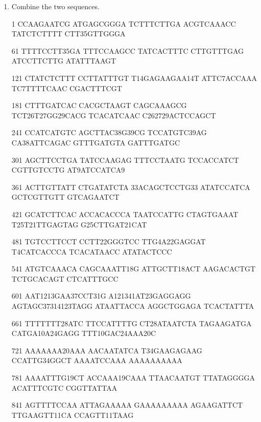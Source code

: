 \begin{enumerate}
{1501   ATTAGTCAAA ACGGACCAAG AAGATGAT}


Arabidopsis BAN promoter:

{\tiny
1      TTGGTA9GATG AT16AAC917AAATC AGAACTCTG13A AGG1617TCAA1324TCT TTTTT24GATTC TTA18GG12TG14AAG

61     ACAAG121418TTGGT T1ATTTCAAA1G ATCACGTG2CT TACCTT2CTAA AACAG3CCTTA TTGA3TCTACT

121    GTTGTACCTA 20A21TG22A19GCAAGG20 A22CTATTTG45C1921A A15ATCTT4TT5TA CTTCTT15A7TAT A23GAAG7TCTCA

181    AGA23CGATAAA CTCATAAC8AA CTAAAT81011C6TCT ATCTCT611G10TAA TTTCAAAAGT ACAATC}

\item Combine the two sequences.

{\tiny

1      CCAAGAATCG ATGAGCGGGA TCTTTCTTGA ACGTCAAACC TATCTCTTTT CTT35GTTGGGA

61     TTTTCCTT35GA TTTCCAAGCC TATCACTTTC CTTGTTTGAG ATCCTTCTTG ATATTTAAGT

121    CTATCTCTTT CCTTATTTGT T14GAGAAGAA14T ATTC7ACCAAA TC7TTTTCAAC CGACTTTCGT

181    CTTTGATCAC CACGCTAAGT CAGCAAAGCG TCT26T27GG29CACG TCACATCAAC C262729ACTCCAGCT

241    CCATCATGTC AGCTTAC38G39CG TCCATGTC39AG CA38ATTCAGAC GTTTGATGTA GATTTGATGC

301    AGCTTCCTGA TATCCAAGAG TTTCCTAATG TCCACCATCT CGTTGTCCTG AT9ATCCATCA9

361    ACTTGTTATT CTGATATCTA 33ACAGCTCCTG33 ATATCCATCA GCTCGTTGTT GTCAGAATCT

421    GCATCTTCAC ACCACACCCA TAATCCATTG CTAGTGAAAT T25T21TTGAGTAG G25CTTGAT21CAT

481    TGTCCTTCCT CCTT22GGGTCC TTG4A22GAGGAT T4CATCACCCA TCACATAACC ATATACTCCC

541    ATGTCAAACA CAGCAAATT18G ATTGCTT18ACT AAGACACTGT TCTGCACAGT CTCATTTGCC

601    AAT1213GAA37CCT31G A121341AT23GAGGAGG AGTAGC37314123TAGG ATAATTACCA AGGCTGGAGA TCACTATTTA

661    TTTTTTT28ATC TTCCATTTTG CT28ATAATCTA TAGAAGATGA CATGA10A24GAGG TTT10GAC24AAA20C

721    AAAAAAA20AAA AACAATATCA T34GAAGAGAAG CCATTG34GGCT AAAATCCAAA AAAAAAAAAA

781    AAAATTTG19CT ACCAAA19CAAA TTAACAATGT TTATAGGGGA ACATTTCGTC CGGTTATTAA

841    AGTTTTCCAA ATTAGAAAAA GAAAAAAAAA AGAAGATTCT TTGAAGTT11CA CCAGTT11TAAG

}
\end{enumerate}
